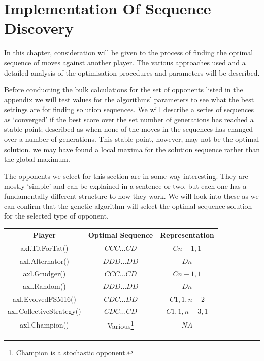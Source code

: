 \chapter{Implementation Of Sequence Discovery}\label{ch:implementation}
In this chapter, consideration will be given to the process of finding the optimal sequence of moves against another player.
The various approaches used and a detailed analysis of the optimisation procedures and parameters will be described.

Before conducting the bulk calculations for the set of opponents listed in the appendix we will test values for the algorithms' parameters to see what the best settings are for finding solution sequences.
We will describe a series of sequences as `converged' if the best score over the set number of generations has reached a stable point;
described as when none of the moves in the sequences has changed over a number of generations.
This stable point, however, may not be the optimal solution.
we may have found a local maxima for the solution sequence rather than the global maximum.

The opponents we select for this section are in some way interesting.
They are mostly `simple' and can be explained in a sentence or two, but each one has a fundamentally different structure to how they work.
We will look into these as we can confirm that the genetic algorithm will select the optimal sequence solution for the selected type of opponent.

\begin{table}
    \centering
    \begin{tabular}{ccc}
        \toprule
        Player & Optimal Sequence & Representation\\
        \midrule
        axl.TitForTat()&\(CCC\ldots CD\)& $Cn-1,1$\\
        axl.Alternator()&\(DDD\ldots DD\)&$Dn$\\
        axl.Grudger()&\(CCC\ldots CD\)&$Cn-1,1$\\
        axl.Random()&\(DDD\ldots DD\)&$Dn$\\
        axl.EvolvedFSM16()& $CDC\ldots DD$ & $C1,1,n-2$\\
        axl.CollectiveStrategy()&$CDC\ldots CD$&$C1,1,n-3,1$\\
        axl.Champion()& Various\footnote{Champion is a stochastic opponent.} & $NA$\\
        \bottomrule
    \end{tabular}
\end{table}

